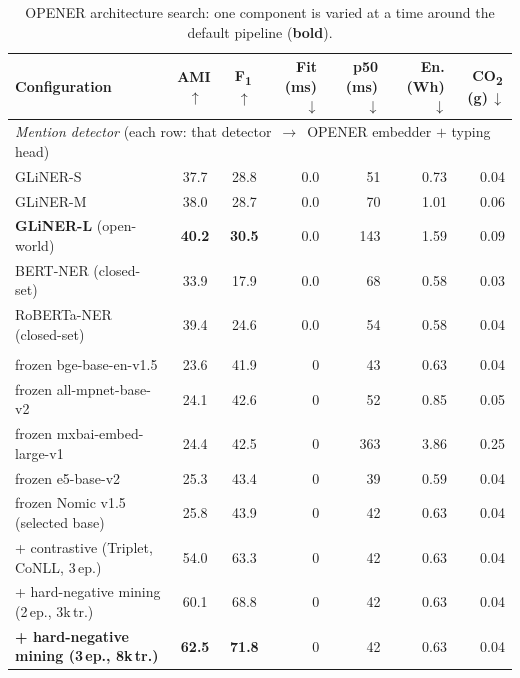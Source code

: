 \begin{table}[tbp]
\centering
\caption{OPENER architecture search: one component is varied at a time around the default pipeline (\textbf{bold}).}
\label{tab:ablation}
\small
\begin{threeparttable}
\begin{tabular}{lccrrrr}
\toprule
Configuration & AMI\,$\uparrow$ & F\textsubscript{1}\,$\uparrow$ & Fit\,(ms)\,$\downarrow$ & p50\,(ms)\,$\downarrow$ & En.\,(Wh)\,$\downarrow$ & CO\textsubscript{2}\,(g)\,$\downarrow$ \\
\midrule
\multicolumn{7}{l}{\emph{Mention detector} (each row: that detector \,$\rightarrow$\, OPENER embedder $+$ typing head)} \\
\quad GLiNER-S                       & 37.7 & 28.8 & 0.0 & 51 & 0.73 & 0.04 \\
\quad GLiNER-M                       & 38.0 & 28.7 & 0.0 & 70 & 1.01 & 0.06 \\
\quad \textbf{GLiNER-L} (open-world) & \textbf{40.2} & \textbf{30.5} & 0.0 & 143 & 1.59 & 0.09 \\
\quad BERT-NER (closed-set) \cite{devlin2019bert}      & 33.9 & 17.9 & 0.0 & 68 & 0.58 & 0.03 \\
\quad RoBERTa-NER (closed-set) \cite{liu2019roberta}   & 39.4 & 24.6 & 0.0 & 54 & 0.58 & 0.04 \\
\addlinespace
\multicolumn{7}{l}{\emph{Entity embedder}$^{\ast}$} \\
\quad frozen bge-base-en-v1.5 \cite{xiao2024cpack}      & 23.6 & 41.9 & 0 & 43 & 0.63 & 0.04 \\
\quad frozen all-mpnet-base-v2 \cite{song2020mpnet}     & 24.1 & 42.6 & 0 & 52 & 0.85 & 0.05 \\
\quad frozen mxbai-embed-large-v1 \cite{li2024aoe}      & 24.4 & 42.5 & 0 & 363 & 3.86 & 0.25 \\
\quad frozen e5-base-v2 \cite{wang2022e5}               & 25.3 & 43.4 & 0 & 39 & 0.59 & 0.04 \\
\quad frozen Nomic v1.5 (selected base)                 & 25.8 & 43.9 & 0 & 42 & 0.63 & 0.04 \\
\quad + contrastive (Triplet, CoNLL, 3\,ep.)            & 54.0 & 63.3 & 0 & 42 & 0.63 & 0.04 \\
\quad + hard-negative mining (2\,ep., 3k\,tr.)          & 60.1 & 68.8 & 0 & 42 & 0.63 & 0.04 \\
\quad \textbf{+ hard-negative mining (3\,ep., 8k\,tr.)} & \textbf{62.5} & \textbf{71.8} & 0 & 42 & 0.63 & 0.04 \\

\end{tabular}
\end{threeparttable}
\end{table}
